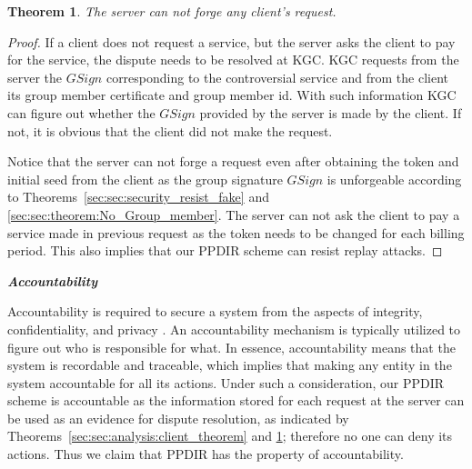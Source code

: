 \documentclass[letterpaper,12pt]{article}
\newtheorem{theorem}{Theorem}
\begin{document}
\begin{theorem} \label{lemma:server:no:forge}
The server can not forge any client's request.
\end{theorem}

\begin{proof}
 If a client does not request a service, but the server asks the client to pay for the service, the dispute needs to be resolved at KGC. KGC requests from the server the $GSign$ corresponding to the controversial service and from the client its group member certificate and group member id. With such information KGC can figure out whether the $GSign$ provided by the server is made by the client. If not, it is obvious that the client did not make the request.

Notice that the server can not forge a request even after obtaining the token and initial seed from the client as the group signature $GSign$ is unforgeable according to Theorems~\ref{sec:sec:security_resist_fake} and \ref{sec:sec:theorem:No_Group_member}. The server can not ask the client to pay a service made in previous request as the token needs to be changed for each billing period. This also implies that our PPDIR scheme can resist replay attacks.
\end{proof}




\textbf{\emph{Accountability}}

Accountability is required to secure a system from the aspects of integrity, confidentiality, and privacy \cite{liu2014achieving, jagadeesan2009towards, truderung2010accountability, feigenbaum2011towards, ko1993analysis}. An accountability mechanism is typically utilized to figure out who is responsible for what. In essence, accountability means that the system is recordable and traceable, which implies that making any entity in the system accountable for all its actions. Under such a consideration, our PPDIR scheme is accountable as the information stored for each request at the server can be used as an evidence for dispute resolution, as indicated by Theorems~\ref{sec:sec:analysis:client_theorem} and \ref{lemma:server:no:forge}; therefore no one can deny its actions.
Thus we claim that PPDIR has the property of accountability.
\end{document}
